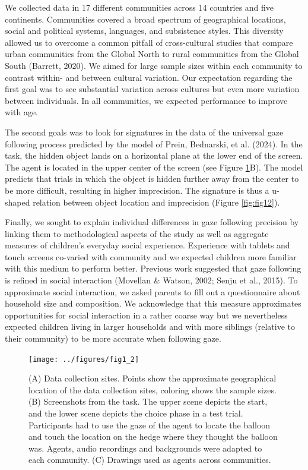 \documentclass[
  man,floatsintext]{apa7}
\begin{document}
We collected data in 17 different communities across 14 countries and five continents. Communities covered a broad spectrum of geographical locations, social and political systems, languages, and subsistence styles. This diversity allowed us to overcome a common pitfall of cross-cultural studies that compare urban communities from the Global North to rural communities from the Global South (Barrett, 2020). We aimed for large sample sizes within each community to contrast within- and between cultural variation. Our expectation regarding the first goal was to see substantial variation across cultures but even more variation between individuals. In all communities, we expected performance to improve with age.

The second goals was to look for signatures in the data of the universal gaze following process predicted by the model of Prein, Bednarski, et al. (2024). In the task, the hidden object lands on a horizontal plane at the lower end of the screen. The agent is located in the upper center of the screen (see Figure \ref{fig:fig1}B). The model predicts that trials in which the object is hidden further away from the center to be more difficult, resulting in higher imprecision. The signature is thus a u-shaped relation between object location and imprecision (Figure \ref{fig:fig12}).

Finally, we sought to explain individual differences in gaze following precision by linking them to methodological aspects of the study as well as aggregate measures of children's everyday social experience. Experience with tablets and touch screens co-varied with community and we expected children more familiar with this medium to perform better. Previous work suggested that gaze following is refined in social interaction (Movellan \& Watson, 2002; Senju et al., 2015). To approximate social interaction, we asked parents to fill out a questionnaire about household size and composition. We acknowledge that this measure approximates opportunities for social interaction in a rather coarse way but we nevertheless expected children living in larger households and with more siblings (relative to their community) to be more accurate when following gaze.

\begin{figure}

{\centering \texttt{[image: ../figures/fig1\_2]} 

}

\caption{(A) Data collection sites. Points show the approximate geographical location of the data collection sites, coloring shows the sample sizes. (B) Screenshots from the task. The upper scene depicts the start, and the lower scene depicts the choice phase in a test trial. Participants had to use the gaze of the agent to locate the balloon and touch the location on the hedge where they thought the balloon was. Agents, audio recordings and backgrounds were adapted to each community. (C) Drawings used as agents across communities.}\label{fig:fig1}
\end{figure}
\end{document}
